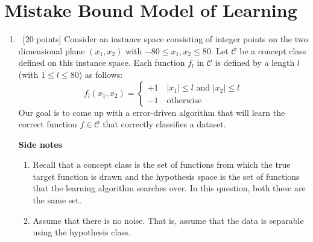 \section{Mistake Bound Model of Learning}\label{sec:q2}

\begin{enumerate}
    \item~[20 points] Consider an instance space consisting of integer points on the two dimensional plane $(x_1,x_2)$ with $ -80 \le x_1,x_2 \le 80$.
        Let $\mathcal{C}$ be a concept class defined on this instance space. Each function $f_l$ in $\mathcal{C}$ is defined by a length $l$ (with $1\le l\le 80$) as follows:
        \begin{equation}
            f_l(x_1,x_2) = \begin{cases}
                +1 \quad \vert x_1\vert \le l \text{ and } \vert x_2\vert \le l \\
                -1 \quad \text{otherwise}
            \end{cases}
            \label{eq-0}
        \end{equation}
        Our goal is to come up with a error-driven algorithm that will learn the correct function $f\in\mathcal{C}$ that correctly classifies a dataset.

        \textbf{Side notes}
        \begin{enumerate}
            \item Recall that a concept class is the set of functions from which the true target function is drawn and the hypothesis space is the set of functions that the learning algorithm searches over. In this question, both these are the same set.
            \item Assume that there is no noise. That is, assume that the data is separable using the hypothesis class.
        \end{enumerate}


\end{enumerate}
